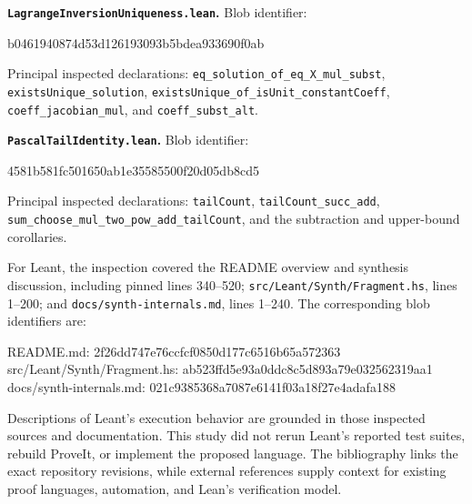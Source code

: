 \documentclass[11pt,a4paper]{article}
\newcommand{\codeid}[1]{\nolinkurl{#1}}
\begin{document}
\textbf{\codeid{LagrangeInversionUniqueness.lean}.} Blob identifier:
\par\noindent\begin{minipage}{\linewidth}
\begin{rawcode}
b0461940874d53d126193093b5bdea933690f0ab
\end{rawcode}
\end{minipage}\par
Principal inspected declarations: \codeid{eq_solution_of_eq_X_mul_subst}, \codeid{existsUnique_solution}, \codeid{existsUnique_of_isUnit_constantCoeff}, \codeid{coeff_jacobian_mul}, and \codeid{coeff_subst_alt}.

\textbf{\codeid{PascalTailIdentity.lean}.} Blob identifier:
\par\noindent\begin{minipage}{\linewidth}
\begin{rawcode}
4581b581fc501650ab1e35585500f20d05db8cd5
\end{rawcode}
\end{minipage}\par
Principal inspected declarations: \codeid{tailCount}, \codeid{tailCount_succ_add}, \codeid{sum_choose_mul_two_pow_add_tailCount}, and the subtraction and upper-bound corollaries.

For Leant, the inspection covered the README overview and synthesis discussion, including pinned lines 340--520; \codeid{src/Leant/Synth/Fragment.hs}, lines 1--200; and \codeid{docs/synth-internals.md}, lines 1--240. The corresponding blob identifiers are:
\par\noindent\begin{minipage}{\linewidth}
\begin{rawcode}
README.md:
  2f26dd747e76ccfcf0850d177c6516b65a572363
src/Leant/Synth/Fragment.hs:
  ab523ffd5e93a0ddc8c5d893a79e032562319aa1
docs/synth-internals.md:
  021c9385368a7087e6141f03a18f27e4adafa188
\end{rawcode}
\end{minipage}\par

Descriptions of Leant's execution behavior are grounded in those inspected sources and documentation. This study did not rerun Leant's reported test suites, rebuild ProveIt, or implement the proposed language. The bibliography links the exact repository revisions, while external references supply context for existing proof languages, automation, and Lean's verification model.
\end{document}
